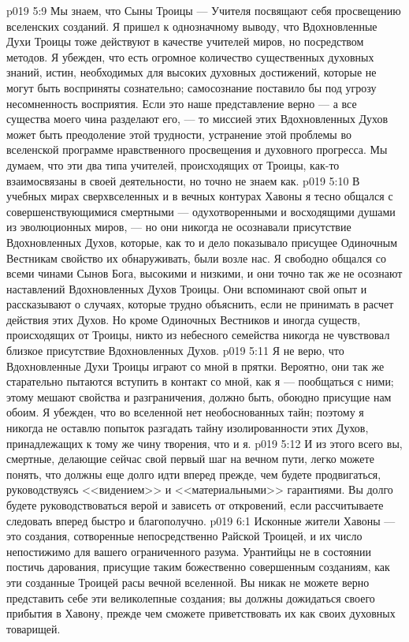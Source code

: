 \vs p019 5:9 Мы знаем, что Сыны Троицы --- Учителя посвящают себя  просвещению вселенских созданий. Я пришел к однозначному выводу, что Вдохновленные Духи Троицы тоже действуют в качестве учителей миров, но посредством  методов. Я убежден, что есть огромное количество существенных духовных знаний, истин, необходимых для высоких духовных достижений, которые не могут быть восприняты сознательно; самосознание поставило бы под угрозу несомненность восприятия. Если это наше представление верно --- а все существа моего чина разделают его, --- то миссией этих Вдохновленных Духов может быть преодоление этой трудности, устранение этой проблемы во вселенской программе нравственного просвещения и духовного прогресса. Мы думаем, что эти два типа учителей, происходящих от Троицы, как\hyp{}то взаимосвязаны в своей деятельности, но точно не знаем как.
\vs p019 5:10 В учебных мирах сверхвселенных и в вечных контурах Хавоны я тесно общался с совершенствующимися смертными --- одухотворенными и восходящими душами из эволюционных миров, --- но они никогда не осознавали присутствие Вдохновленных Духов, которые, как то и дело показывало присущее Одиночным Вестникам свойство их обнаруживать, были возле нас. Я свободно общался со всеми чинами Сынов Бога, высокими и низкими, и они точно так же не осознают наставлений Вдохновленных Духов Троицы. Они вспоминают свой опыт и рассказывают о случаях, которые трудно объяснить, если не принимать в расчет действия этих Духов. Но кроме Одиночных Вестников и иногда существ, происходящих от Троицы, никто из небесного семейства никогда не чувствовал близкое присутствие Вдохновленных Духов.
\vs p019 5:11 Я не верю, что Вдохновленные Духи Троицы играют со мной в прятки. Вероятно, они так же старательно пытаются вступить в контакт со мной, как я --- пообщаться с ними; этому мешают свойства и разграничения, должно быть, обоюдно присущие нам обоим. Я убежден, что во вселенной нет необоснованных тайн; поэтому я никогда не оставлю попыток разгадать тайну изолированности этих Духов, принадлежащих к тому же чину творения, что и я.
\vs p019 5:12 И из этого всего вы, смертные, делающие сейчас свой первый шаг на вечном пути, легко можете понять, что должны еще долго идти вперед прежде, чем будете продвигаться, руководствуясь <<видением>> и <<материальными>> гарантиями. Вы долго будете руководствоваться верой и зависеть от откровений, если рассчитываете следовать вперед быстро и благополучно.
\vs p019 6:1 Исконные жители Хавоны --- это создания, сотворенные непосредственно Райской Троицей, и их число непостижимо для вашего ограниченного разума. Урантийцы не в состоянии постичь дарования, присущие таким божественно совершенным созданиям, как эти созданные Троицей расы вечной вселенной. Вы никак не можете верно представить себе эти великолепные создания; вы должны дожидаться своего прибытия в Хавону, прежде чем сможете приветствовать их как своих духовных товарищей.
